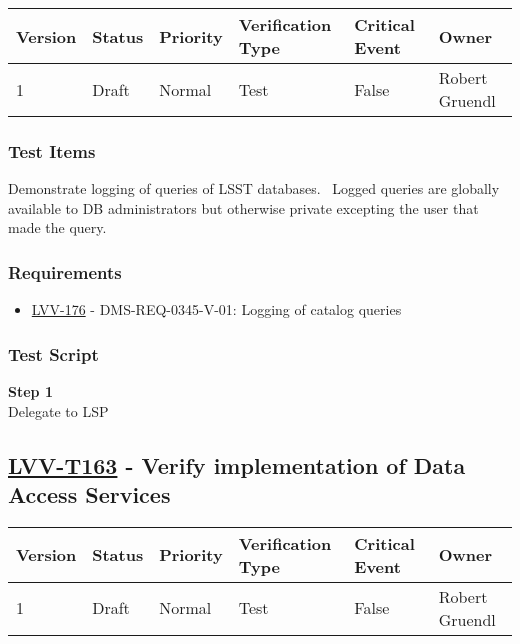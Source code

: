 \begin{longtable}[]{@{}llllll@{}}
\toprule
Version & Status & Priority & Verification Type & Critical Event &
Owner\tabularnewline
\midrule
\endhead
1 & Draft & Normal & Test & False & Robert Gruendl\tabularnewline
\bottomrule
\end{longtable}

\subsubsection{Test Items}\label{test-items-28}

Demonstrate logging of queries of LSST databases. ~Logged queries are
globally available to DB administrators but otherwise private excepting
the user that made the query.

\subsubsection{Requirements}\label{requirements-28}

\begin{itemize}
\tightlist
\item
  \href{https://jira.lsstcorp.org/browse/LVV-176}{LVV-176} -
  DMS-REQ-0345-V-01: Logging of catalog queries
\end{itemize}

\subsubsection{Test Script}\label{test-script-28}

\textbf{Step 1}\\
Delegate to LSP\\[2\baselineskip]

\hypertarget{lvv-t163---verify-implementation-of-data-access-services}{\subsection{\texorpdfstring{\href{https://jira.lsstcorp.org/secure/Tests.jspa\#/testCase/LVV-T163}{LVV-T163}
- Verify implementation of Data Access
Services}{LVV-T163 - Verify implementation of Data Access Services}}\label{lvv-t163---verify-implementation-of-data-access-services}}

\begin{longtable}[]{@{}llllll@{}}
\toprule
Version & Status & Priority & Verification Type & Critical Event &
Owner\tabularnewline
\midrule
\endhead
1 & Draft & Normal & Test & False & Robert Gruendl\tabularnewline
\bottomrule
\end{longtable}

